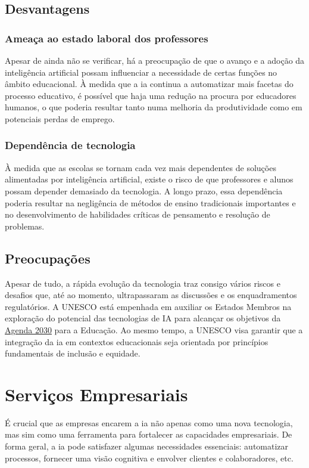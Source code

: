 \documentclass[a4paper, 11pt, onecolumn, oneside]{report}
\begin{document}
\subsection{Desvantagens}
\subsubsection{Ameaça ao estado laboral dos professores}
Apesar de ainda não se verificar, há a preocupação de que o avanço e a adoção da inteligência artificial possam influenciar a necessidade de certas funções no âmbito educacional. À medida que a \ac{ia} continua a automatizar mais facetas do processo educativo, é possível que haja uma redução na procura por educadores humanos, o que poderia resultar tanto numa melhoria da produtividade como em potenciais perdas de emprego.

\subsubsection{Dependência de tecnologia}
À medida que as escolas se tornam cada vez mais dependentes de soluções alimentadas por inteligência artificial, existe o risco de que professores e alunos possam depender demasiado da tecnologia. A longo prazo, essa dependência poderia resultar na negligência de métodos de ensino tradicionais importantes e no desenvolvimento de habilidades críticas de pensamento e resolução de problemas.


\subsection{Preocupações}
Apesar de tudo, a rápida evolução da tecnologia traz consigo vários riscos e desafios que, até ao momento, ultrapassaram as discussões e os enquadramentos regulatórios. A UNESCO está empenhada em auxiliar os Estados Membros na exploração do potencial das tecnologias de IA para alcançar os objetivos da \href{https://www.unesco.org/sdg4education2030/en}{Agenda 2030} para a Educação. Ao mesmo tempo, a UNESCO visa garantir que a integração da \ac{ia} em contextos educacionais seja orientada por princípios fundamentais de inclusão e equidade.\cite{ai_education}


\section{Serviços Empresariais}
É crucial que as empresas encarem a \ac{ia} não apenas como uma nova tecnologia, mas sim como uma ferramenta para fortalecer as capacidades empresariais. De forma geral, a \ac{ia} pode satisfazer algumas necessidades essenciais: automatizar processos, fornecer uma visão cognitiva e envolver clientes e colaboradores, etc.
\end{document}
